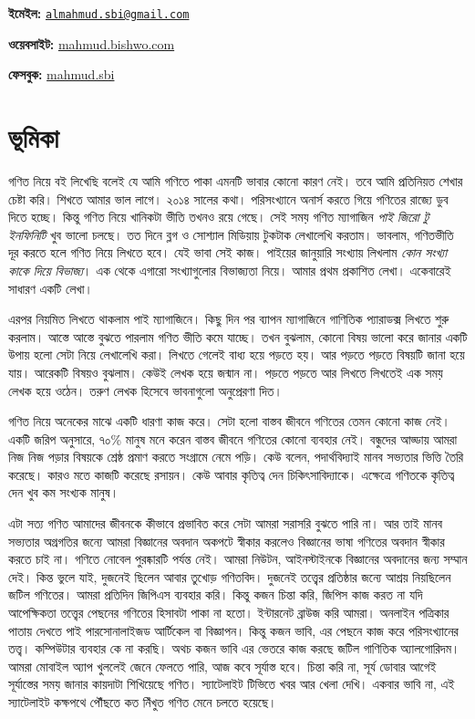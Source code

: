 \documentclass[
]{book}
\begin{document}
\textbf{ইমেইল:} \href{mailto:almahmud.sbi@gmail.com}{\nolinkurl{almahmud.sbi@gmail.com}}

\textbf{ওয়েবসাইট:} \href{https://mahmud.bishwo.com}{mahmud.bishwo.com}

\textbf{ফেসবুক:} \href{https://fb.com/mahmud.sbi}{mahmud.sbi}

\hypertarget{ux9adux9c2ux9aeux9bfux995ux9be}{%
\section{ভূমিকা}\label{ux9adux9c2ux9aeux9bfux995ux9be}}

গণিত নিয়ে বই লিখেছি বলেই যে আমি গণিতে পাকা এমনটি ভাবার কোনো কারণ নেই। তবে আমি প্রতিনিয়ত শেখার চেষ্টা করি। শিখতে আমার ভাল লাগে। ২০১৪ সালের কথা। পরিসংখ্যানে অনার্স করতে গিয়ে গণিতের রাজ্যে ডুব দিতে হচ্ছে। কিন্তু গণিত নিয়ে খানিকটা ভীতি তখনও রয়ে গেছে। সেই সময় গণিত ম্যাগাজিন \emph{পাই জিরো টু ইনফিনিটি} খুব ভালো চলছে। তত দিনে ব্লগ ও সোশ্যাল মিডিয়ায় টুকটাক লেখালেখি করতাম। ভাবলাম, গণিতভীতি দূর করতে হলে গণিত নিয়ে লিখতে হবে। যেই ভাবা সেই কাজ। পাইয়ের জানুয়ারি সংখ্যায় লিখলাম \emph{কোন সংখ্যা কাকে দিয়ে বিভাজ্য}। এক থেকে এগারো সংখ্যাগুলোর বিভাজ্যতা নিয়ে। আমার প্রথম প্রকাশিত লেখা। একেবারেই সাধারণ একটি লেখা।

এরপর নিয়মিত লিখতে থাকলাম পাই ম্যাগাজিনে। কিছু দিন পর ব্যাপন ম্যাগাজিনে গাণিতিক প্যারাডক্স লিখতে শুরু করলাম। আস্তে আস্তে বুঝতে পারলাম গণিত ভীতি কমে যাচ্ছে। তখন বুঝলাম, কোনো বিষয় ভালো করে জানার একটি উপায় হলো সেটা নিয়ে লেখালেখি করা। লিখতে গেলেই বাধ্য হয়ে পড়তে হয়। আর পড়তে পড়তে বিষয়টি জানা হয়ে যায়। আরেকটি বিষয়ও বুঝলাম। কেউই লেখক হয়ে জন্মান না। পড়তে পড়তে আর লিখতে লিখতেই এক সময় লেখক হয়ে ওঠেন। তরুণ লেখক হিসেবে ভাবনাগুলো অনুপ্রেরণা দিত।

গণিত নিয়ে অনেকের মাঝে একটি ধারণা কাজ করে। সেটা হলো বাস্তব জীবনে গণিতের তেমন কোনো কাজ নেই। একটি জরিপ অনুসারে, ৭০\% মানুষ মনে করেন বাস্তব জীবনে গণিতের কোনো ব্যবহার নেই। বন্ধুদের আড্ডায় আমরা নিজ নিজ পড়ার বিষয়কে শ্রেষ্ঠ প্রমাণ করতে সংগ্রামে নেমে পড়ি। কেউ বলেন, পদার্থবিদ্যাই মানব সভ্যতার ভিত্তি তৈরি করেছে। কারও মতে কাজটি করেছে রসায়ন। কেউ আবার কৃতিত্ব দেন চিকিৎসাবিদ্যাকে। এক্ষেত্রে গণিতকে কৃতিত্ব দেন খুব কম সংখ্যক মানুষ।

এটা সত্য গণিত আমাদের জীবনকে কীভাবে প্রভাবিত করে সেটা আমরা সরাসরি বুঝতে পারি না। আর তাই মানব সভ্যতার অগ্রগতির জন্যে আমরা বিজ্ঞানের অবদান অকপটে স্বীকার করলেও বিজ্ঞানের ভাষা গণিতের অবদান স্বীকার করতে চাই না। গণিতে নোবেল পুরষ্কারটি পর্যন্ত নেই। আমরা নিউটন, আইনস্টাইনকে বিজ্ঞানের অবদানের জন্য সম্মান দেই। কিন্ত ভুলে যাই, দুজনেই ছিলেন আবার তুখোড় গণিতবিদ। দুজনেই তত্ত্বের প্রতিষ্ঠার জন্যে আশ্রয় নিয়ছিলেন জটিল গণিতের।
আমরা প্রতিদিন জিপিএস ব্যবহার করি। কিন্তু কজন চিন্তা করি, জিপিস কাজ করত না যদি আপেক্ষিকতা তত্ত্বের পেছনের গণিতের হিসাবটা পাকা না হতো। ইন্টারনেট ব্রাউজ করি আমরা। অনলাইন পত্রিকার পাতায় দেখতে পাই পারসোনালাইজড আর্টিকেল বা বিজ্ঞাপন। কিন্তু কজন ভাবি, এর পেছনে কাজ করে পরিসংখ্যানের তত্ত্ব। কম্পিউটার ব্যবহার কে না করছি। অথচ কজন ভাবি এর ভেতরে কাজ করছে জটিল গাণিতিক অ্যালগোরিদম। আমরা মোবাইল অ্যাপ খুললেই জেনে ফেলতে পারি, আজ কবে সূর্যাস্ত হবে। চিন্তা করি না, সূর্য ডোবার আগেই সূর্যাস্তের সময় জানার কায়দাটা শিখিয়েছে গণিত। স্যাটেলাইট টিভিতে খবর আর খেলা দেখি। একবার ভাবি না, এই স্যাটেলাইট কক্ষপথে পৌঁছতে কত নিঁখুত গণিত মেনে চলতে হয়েছে।
\end{document}
